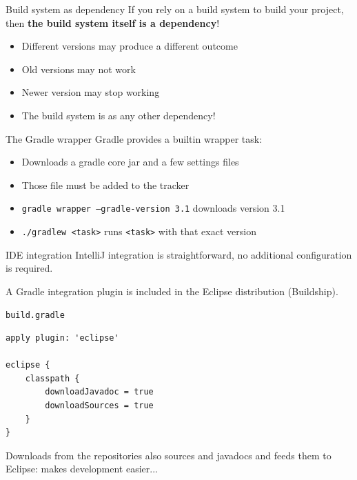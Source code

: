 \documentclass[presentation]{beamer}
\begin{document}
\begin{frame}[fragile]{Build system as dependency}
	If you rely on a build system to build your project, then \textbf{the build system itself is a dependency}!
	\begin{itemize}
		\item Different versions may produce a different outcome
		\item Old versions may not work
		\item Newer version may stop working
		\item The build system is as any other dependency!
	\end{itemize}
	\begin{block}{The Gradle wrapper}
		Gradle provides a builtin wrapper task:
		\begin{itemize}
			\item Downloads a gradle core jar and a few settings files
			\item Those file must be added to the tracker
			\item \texttt{gradle wrapper --gradle-version 3.1} downloads version 3.1
			\item \texttt{./gradlew <task>} runs \texttt{<task>} with that exact version
		\end{itemize}
	\end{block}
\end{frame}

\begin{frame}[fragile]{IDE integration}
	IntelliJ integration is straightforward, no additional configuration is required.
	
	A Gradle integration plugin is included in the Eclipse distribution (Buildship).
	\begin{block}{\texttt{build.gradle}}
		\begin{verbatim}
apply plugin: 'eclipse'

eclipse {
    classpath {
        downloadJavadoc = true
        downloadSources = true
    }
}
		\end{verbatim}
	\end{block}
	Downloads from the repositories also sources and javadocs and feeds them to Eclipse: makes development easier...
\end{frame}
\end{document}
